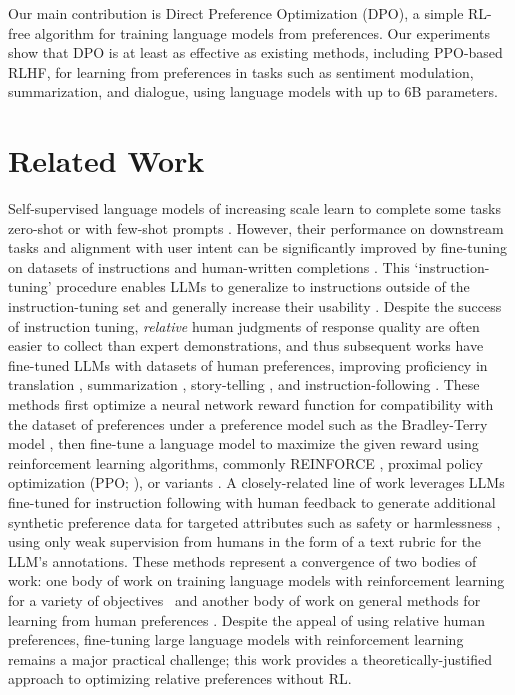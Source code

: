 \documentclass{article}
\newcommand{\methodac}{DPO}
\newcommand{\methodfull}{Direct Preference Optimization}
\begin{document}
Our main contribution is {\methodfull} (\methodac), a simple RL-free algorithm for training language models from preferences. Our experiments show that {\methodac} is at least as effective as existing methods, including PPO-based RLHF, for learning from preferences in tasks such as sentiment modulation, summarization, and dialogue, using language models with up to 6B parameters.

\section{Related Work}

Self-supervised language models of increasing scale learn to complete some tasks zero-shot \citep{radford2019language} or with few-shot prompts \citep{gpt3,megatron,chowdhery2022palm}. However, their performance on downstream tasks and alignment with user intent can be significantly improved by fine-tuning on datasets of instructions and human-written completions \citep{mishra-etal-2022-cross,sanh2022multitask,chung2022scaling,thoppilan2022lamda}. This `instruction-tuning' procedure
enables LLMs to generalize to instructions outside of the instruction-tuning set and generally increase their usability \citep{chung2022scaling}. Despite the success of instruction tuning, \textit{relative} human judgments of response quality are often easier to collect than expert demonstrations, and thus subsequent works have fine-tuned LLMs with datasets of human preferences, improving proficiency in translation \citep{kreutzer-etal-2018-reliability}, summarization \citep{stiennon2022learning,ziegler2020finetuning}, story-telling \citep{ziegler2020finetuning}, and instruction-following \citep{ouyang2022training,ramamurthy2023is}. These methods first optimize a neural network reward function for compatibility with the dataset of preferences under a preference model such as the Bradley-Terry model \citep{bradley1952rankanalysis}, then fine-tune a language model to maximize the given reward using reinforcement learning algorithms, commonly REINFORCE \citep{williams1992reinforce}, proximal policy optimization (PPO; \cite{schulman2017proximal}), or variants \citep{ramamurthy2023is}. A closely-related line of work leverages LLMs fine-tuned for instruction following with human feedback to generate additional synthetic preference data for targeted attributes such as safety or harmlessness \citep{bai2022constitutional}, using only weak supervision from humans in the form of a text rubric for the LLM's annotations. These methods represent a convergence of two bodies of work: one body of work on training language models with reinforcement learning for a variety of objectives~\citep{Ranzato2015SequenceLT,paulus2018a,wu2018learning} and another body of work on general methods for learning from human preferences \citep{christiano2017deep,kupcsik2018learning}. 
Despite the appeal of using relative human preferences, fine-tuning large language models with reinforcement learning remains a major practical challenge; this work provides a theoretically-justified approach to optimizing relative preferences without RL.
\end{document}
